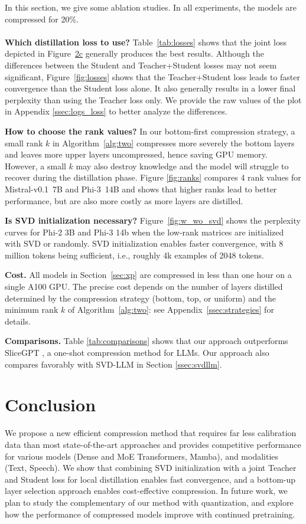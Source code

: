 \documentclass[11pt]{article}
\newcommand{\myparagraph}[1]{\noindent\textbf{#1}}
\begin{document}
In this section, we give some ablation studies. In all experiments, the models are compressed for 20\%. \\
\\
\myparagraph{Which distillation loss to use?} Table~\ref{tab:losses} shows that the joint loss depicted in Figure~\hyperref[fig:teacher_student]{2c} generally produces the best results. Although the differences between the Student and Teacher+Student
losses may not seem significant, Figure~\ref{fig:losses} shows that the Teacher+Student loss leads to faster convergence than the Student loss alone. It also generally results in a lower final perplexity than using the Teacher loss only. We provide the raw values of the plot in Appendix \ref{ssec:logs_loss} to better analyze the differences.


\myparagraph{How to choose the rank values?}
In our bottom-first compression strategy, a small rank $k$ in
Algorithm~\ref{alg:two} compresses more severely the bottom layers and leaves
more upper layers uncompressed, hence saving GPU memory. However, a
small $k$ may also destroy knowledge and the model will struggle to recover
during the distillation phase. Figure \ref{fig:ranks} compares 4 rank
values for Mistral-v0.1~7B and Phi-3~14B and shows that higher ranks
lead to better performance, but are also more costly as more layers are distilled.

\myparagraph{Is SVD initialization necessary?} Figure~\ref{fig:w_wo_svd} shows
the perplexity curves for Phi-2 3B and Phi-3 14b when the low-rank matrices are
initialized with SVD or randomly. SVD initialization enables faster
convergence, with 8 million tokens being sufficient, i.e., roughly
4k examples of 2048 tokens.

\myparagraph{Cost.} All models in Section~\ref{sec:xp} are compressed
in less than one hour on a single A100 GPU. The precise cost
depends on the number of layers distilled determined by
the compression strategy (bottom, top, or uniform) and the minimum rank $k$ of
Algorithm~\ref{alg:two}: see Appendix~\ref{ssec:strategies} for details.

\myparagraph{Comparisons.} Table \ref{tab:comparisons} shows that our approach outperforms SliceGPT \citep{ashkboos_slicegpt_2024}, a one-shot compression method for LLMs. Our approach also compares favorably with SVD-LLM \citep{svdllm} in Section \ref{ssec:svdllm}.

\section{Conclusion}
We propose a new efficient compression method that 
requires far less calibration data than most state-of-the-art approaches
and provides competitive performance for various models (Dense and MoE Transformers, Mamba), and modalities (Text, Speech).
We show that combining SVD initialization with a joint Teacher and Student loss for local distillation enables fast convergence, and a bottom-up layer selection approach enables cost-effective compression.
In future work, we plan to study the complementary of our method with
quantization, and explore how the performance of
compressed models improve with continued pretraining.
\end{document}
